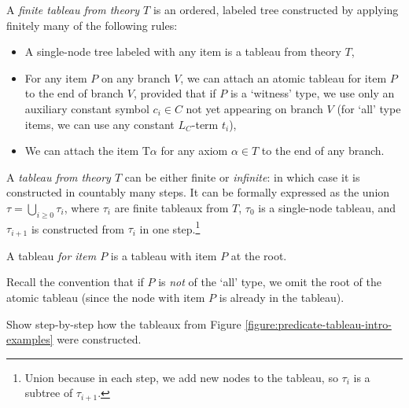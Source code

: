\begin{definition}[Tableau]
    A \emph{finite tableau from theory $T$} is an ordered, labeled tree constructed by applying finitely many of the following rules:
    \begin{itemize}
        \item A single-node tree labeled with any item is a tableau from theory $T$,
        \item For any item $P$ on any branch $V$, we can attach an atomic tableau for item $P$ to the end of branch $V$, provided that if $P$ is a `witness' type, we use only an auxiliary constant symbol $c_i\in C$ not yet appearing on branch $V$ (for `all' type items, we can use any constant $L_C$-term $t_i$),
        \item We can attach the item $\mathrm{T}\alpha$ for any axiom $\alpha\in T$ to the end of any branch.
    \end{itemize}
    A \emph{tableau from theory $T$} can be either finite or \emph{infinite}: in which case it is constructed in countably many steps. It can be formally expressed as the union $\tau=\bigcup_{i\geq 0}\tau_i$, where $\tau_i$ are finite tableaux from $T$, $\tau_0$ is a single-node tableau, and $\tau_{i+1}$ is constructed from $\tau_i$ in one step.\footnote{Union because in each step, we add new nodes to the tableau, so $\tau_i$ is a subtree of $\tau_{i+1}$.}
    
    A tableau \emph{for item $P$} is a tableau with item $P$ at the root.
\end{definition}
    
Recall the convention that if $P$ is \emph{not} of the `all' type, we omit the root of the atomic tableau (since the node with item $P$ is already in the tableau).

\begin{exercise}
    Show step-by-step how the tableaux from Figure \ref{figure:predicate-tableau-intro-examples} were constructed.
\end{exercise}


